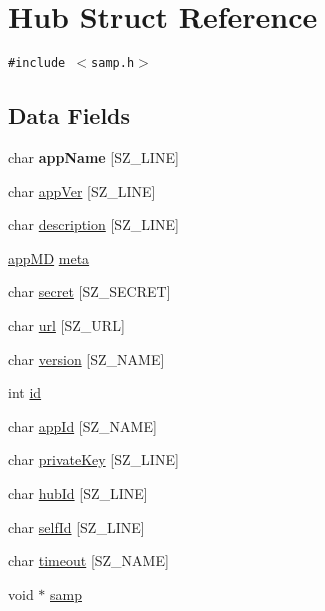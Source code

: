 \hypertarget{structHub}{
\section{Hub Struct Reference}
\label{structHub}
}
{\tt \#include $<$samp.h$>$}

\subsection*{Data Fields}
\begin{CompactItemize}
\item 
\hypertarget{structHub_7fef4c5bc9ee07499a3d7fb238f7d3b0}{
char \textbf{appName} \mbox{[}SZ\_\-LINE\mbox{]}}
\label{structHub_7fef4c5bc9ee07499a3d7fb238f7d3b0}

\item 
char \hyperlink{structHub_8d174b2376fff67044694077b5f44a0c}{appVer} \mbox{[}SZ\_\-LINE\mbox{]}
\item 
char \hyperlink{structHub_0c01a576aab3a38c7003635c21ffb6f6}{description} \mbox{[}SZ\_\-LINE\mbox{]}
\item 
\hyperlink{structappMD}{appMD} \hyperlink{structHub_cfe9051f3f0d6fd908ddf394283d1262}{meta}
\item 
char \hyperlink{structHub_00e09b2ce458d0e43d91e33164025974}{secret} \mbox{[}SZ\_\-SECRET\mbox{]}
\item 
char \hyperlink{structHub_809a3f03e2e80609de4ad7ecd8b3ce19}{url} \mbox{[}SZ\_\-URL\mbox{]}
\item 
char \hyperlink{structHub_6781579d63b6e392837fecc18b481e02}{version} \mbox{[}SZ\_\-NAME\mbox{]}
\item 
int \hyperlink{structHub_3546ac45740591096b9bdc4c37b8d5f5}{id}
\item 
char \hyperlink{structHub_8a3f77e49a9c33a20d272958b4c65c60}{appId} \mbox{[}SZ\_\-NAME\mbox{]}
\item 
char \hyperlink{structHub_a7155581e81f30c08103bdcb55b8630a}{privateKey} \mbox{[}SZ\_\-LINE\mbox{]}
\item 
char \hyperlink{structHub_757e35902156611284f4190e6025639c}{hubId} \mbox{[}SZ\_\-LINE\mbox{]}
\item 
char \hyperlink{structHub_bddf272976fef652a3726c53043c2422}{selfId} \mbox{[}SZ\_\-LINE\mbox{]}
\item 
char \hyperlink{structHub_0489ccea4de8979acba98cfe73662a5a}{timeout} \mbox{[}SZ\_\-NAME\mbox{]}
\item 
void $\ast$ \hyperlink{structHub_8c5492d9cee801c7846d4a3012aea92a}{samp}
\end{CompactItemize}


